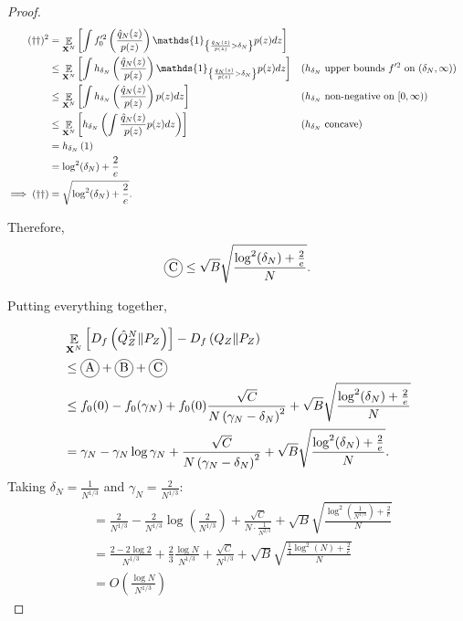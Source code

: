 \begin{proof}
\begin{align*}
    (\dagger\dagger)^2 
    &= \E_{\XN} \left[\int f_0'^2\left(\frac{\hat{q}_N(z)}{p(z)} \right) \mathds{1}_{\left\lbrace \frac{\hat{q}_N(z)}{p(z)} > \delta_N \right\rbrace} p(z) dz \right]
    \\
    &\leq \E_{\XN} \left[ \int h_{\delta_N}\left(\frac{\hat{q}_N(z)}{p(z)} \right) \mathds{1}_{\left\lbrace \frac{\hat{q}_N(z)}{p(z)} > \delta_N \right\rbrace} p(z) dz \right]
    && \text{($h_{\delta_N}$ upper bounds $f'^2$ on $(\delta_N, \infty)$)}
    \\
    &\leq \E_{\XN}\left[ \int h_{\delta_N}\left(\frac{\hat{q}_N(z)}{p(z)} \right) p(z) dz \right]
    && \text{($h_{\delta_N}$ non-negative on $[0, \infty)$)}
    \\
    &\leq \E_{\XN} \left[ h_{\delta_N}\left( \int \frac{\hat{q}_N(z)}{p(z)} p(z) dz \right)  \right]
    && \text{($h_{\delta_N}$ concave)}
    \\
    &=  h_{\delta_N}\left( 1\right) \\
    &= \log^2(\delta_N) + \frac{2}{e} \\
    \implies (\dagger\dagger)&= \sqrt{\log^2(\delta_N) + \frac{2}{e}}.
\end{align*}

Therefore,
\begin{align*}
    \encircle{C} \leq \sqrt{B} \sqrt{\frac{\log^2(\delta_N) + \frac{2}{e}}{N}}.
\end{align*}

Putting everything together,

\begin{align*}
    &\E_{\XN} \left[ D_f\left( \hat{Q}_Z^N \| P_Z\right)\right] - D_f\left( Q_{Z} \| P_Z\right)\\
    &\leq \encircle{A} + \encircle{B} + \encircle{C} \\
    &\leq f_0(0) - f_0(\gamma_N) + f_0(0) \frac{\sqrt{C}}{N \left( \gamma_N - \delta_N \right)^2} + \sqrt{B} \sqrt{\frac{\log^2(\delta_N) + \frac{2}{e}}{N}}\\
    &= \gamma_N - \gamma_N \log \gamma_N  + \frac{\sqrt{C}}{N \left( \gamma_N - \delta_N \right)^2} + \sqrt{B} \sqrt{\frac{\log^2(\delta_N) + \frac{2}{e}}{N}}.
\end{align*}
Taking $\delta_N = \frac{1}{N^{1/3}}$ and $\gamma_N = \frac{2}{N^{1/3}}$:
\begin{align*}
    &=\frac{2}{N^{1/3}} - \frac{2}{N^{1/3}} \log\left( \frac{2}{N^{1/3}}\right) + \frac{ \sqrt{C} }{N \cdot \frac{1}{N^{2/3}} } + \sqrt{B} \sqrt{\frac{\log^2\left(\frac{1}{N^{1/3}}\right) + \frac{2}{e}}{N}}\\
    &= \frac{ 2 - 2\log2}{N^{1/3}} + \frac{2}{3}\frac{\log N}{N^{1/3}} + \frac{\sqrt{C}}{N^{1/3}} + \sqrt{B} \sqrt{\frac{\frac{1}{4}\log^2\left(N\right) + \frac{2}{e}}{N}} \\
    & = O\left( \frac{\log N}{N^{1/3}}\right)
\end{align*}



\end{proof}
